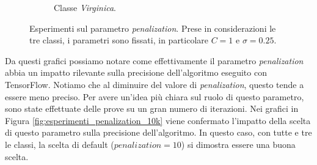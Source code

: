 \documentclass[a4paper,12pt]{report}
\begin{document}
\begin{figure}[H]
\begin{subfigure}{\textwidth}
        \caption{Classe \textit{Virginica}.}
        \label{subfig:Virginica_diffPen}
    \end{subfigure}
    \caption{Esperimenti sul parametro \textit{penalization}. Prese in considerazioni le tre classi, i parametri sono fissati, in particolare $C=1$ e $\sigma=0.25$.}
    \label{fig:esperimenti_penalization}
\end{figure}

\noindent Da questi grafici possiamo notare come effettivamente il parametro \textit{penalization} abbia un impatto rilevante sulla precisione dell'algoritmo eseguito con TensorFlow. Notiamo che al diminuire del valore di \textit{penalization}, questo tende a essere meno preciso. Per avere un'idea più chiara sul ruolo di questo parametro, sono state effettuate delle prove su un gran numero di iterazioni. Nei grafici in Figura \ref{fig:esperimenti_penalization_10k} viene confermato l'impatto della scelta di questo parametro sulla precisione dell'algoritmo. In questo caso, con tutte e tre le classi, la scelta di default ($penalization = 10$) si dimostra essere una buona scelta.
\end{document}
